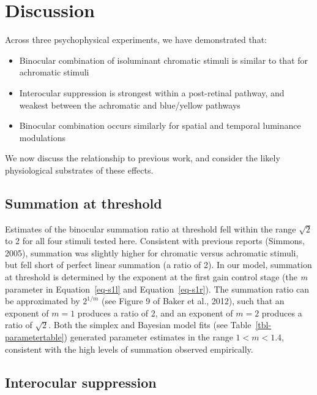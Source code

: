 \documentclass[
  letterpaper,
  DIV=11,
  numbers=noendperiod]{scrartcl}
\providecommand{\tightlist}{%
  \setlength{\itemsep}{0pt}\setlength{\parskip}{0pt}}\usepackage{longtable,booktabs,array}
\begin{document}
\hypertarget{discussion}{%
\section{Discussion}\label{discussion}}

Across three psychophysical experiments, we have demonstrated that:

\begin{itemize}
\tightlist
\item
  Binocular combination of isoluminant chromatic stimuli is similar to
  that for achromatic stimuli
\item
  Interocular suppression is strongest within a post-retinal pathway,
  and weakest between the achromatic and blue/yellow pathways
\item
  Binocular combination occurs similarly for spatial and temporal
  luminance modulations
\end{itemize}

We now discuss the relationship to previous work, and consider the
likely physiological substrates of these effects.

\hypertarget{summation-at-threshold}{%
\subsection{Summation at threshold}\label{summation-at-threshold}}

Estimates of the binocular summation ratio at threshold fell within the
range \(\sqrt{2}\) to 2 for all four stimuli tested here. Consistent
with previous reports (Simmons, 2005), summation was slightly higher for
chromatic versus achromatic stimuli, but fell short of perfect linear
summation (a ratio of 2). In our model, summation at threshold is
determined by the exponent at the first gain control stage (the \emph{m}
parameter in Equation~\ref{eq-s1l} and Equation~\ref{eq-s1r}). The
summation ratio can be approximated by \(2^{1/m}\) (see Figure 9 of
Baker et al., 2012), such that an exponent of \(m=1\) produces a ratio
of 2, and an exponent of \(m = 2\) produces a ratio of \(\sqrt{2}\).
Both the simplex and Bayesian model fits (see
Table~\ref{tbl-parametertable}) generated parameter estimates in the
range \(1 < m < 1.4\), consistent with the high levels of summation
observed empirically.

\hypertarget{interocular-suppression}{%
\subsection{Interocular suppression}\label{interocular-suppression}}
\end{document}

